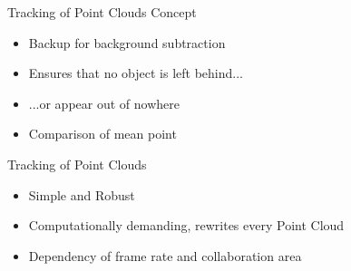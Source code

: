 
\begin{frame}{Tracking of Point Clouds}
Concept
	\begin{itemize}
	\item Backup for background subtraction
	\item Ensures that no object is left behind...
	\item ...or appear out of nowhere
	\item Comparison of mean point
	\end{itemize}
\end{frame}

\begin{frame}{Tracking of Point Clouds}

	\begin{itemize}
	\item Simple and Robust
	\item Computationally demanding, rewrites every Point Cloud
	\item Dependency of frame rate and collaboration area
	\end{itemize}
\end{frame}